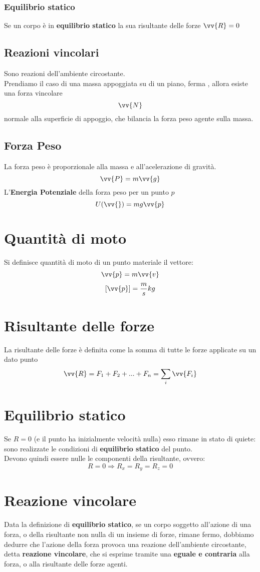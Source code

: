 \documentclass[a4paper]{report}
\begin{document}
  \subsubsection{Equilibrio statico}
  Se un corpo è in \textbf{equilibrio statico} la sua risultante delle forze $\vv{R} = 0$

  \subsection{Reazioni vincolari}
  Sono reazioni dell'ambiente circostante.\\
  Prendiamo il caso di una massa appoggiata su di un piano, ferma , allora esiste una forza vincolare
  $$ \vv{N} $$
  normale alla superficie di appoggio, che bilancia la forza peso agente sulla massa.

  \subsection{Forza Peso}
  La forza peso è proporzionale alla massa e all'acelerazione di gravità.
  $$ \vv{P} = m\vv{g} $$
  L'\textbf{Energia Potenziale} della forza peso per un punto $p$
  $$ U (\vv{}) = mg \vv{p} $$

  \section{Quantità di moto}
  Si definisce quantità di moto di un punto materiale il vettore:
  $$ \vv{p} = m \vv{v} $$
  $$ [\vv{p}] = \frac{m}{s} kg $$

  \section{Risultante delle forze}
  La risultante delle forze è definita come la somma di tutte le forze applicate su un dato punto
  $$ \vv{R} = F_1 + F_2 + ... + F_n = \sum_{i} \vv{F_i} $$

  \section{Equilibrio statico}
  Se $R = 0$ (e il punto ha inizialmente velocità nulla) esso rimane in stato di quiete: sono realizzate le condizioni di \textbf{equilibrio statico} del punto.\\
  Devono quindi essere nulle le componenti della risultante, ovvero:
  $$ R = 0 \Rightarrow R_x = R_y = R_z = 0 $$

  \section{Reazione vincolare}
  Data la definizione di \textbf{equilibrio statico}, se un corpo soggetto all'azione di una forza, o della risultante non nulla di un insieme di forze, rimane fermo, dobbiamo dedurre che l'azione della forza provoca una reazione dell'ambiente circostante, detta \textbf{reazione vincolare}, che si esprime tramite una \textbf{eguale e contraria} alla forza, o alla risultante delle forze agenti.
\end{document}
